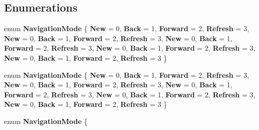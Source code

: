 \subsection*{Enumerations}
\begin{DoxyCompactItemize}
\item 
\mbox{\label{namespace_windows_1_1_u_i_1_1_xaml_1_1_navigation_a9f750cdbb9b4eeea3e47b65bb545d522}} 
enum {\bfseries Navigation\+Mode} \{ \newline
{\bfseries New} = 0, 
{\bfseries Back} = 1, 
{\bfseries Forward} = 2, 
{\bfseries Refresh} = 3, 
\newline
{\bfseries New} = 0, 
{\bfseries Back} = 1, 
{\bfseries Forward} = 2, 
{\bfseries Refresh} = 3, 
\newline
{\bfseries New} = 0, 
{\bfseries Back} = 1, 
{\bfseries Forward} = 2, 
{\bfseries Refresh} = 3, 
\newline
{\bfseries New} = 0, 
{\bfseries Back} = 1, 
{\bfseries Forward} = 2, 
{\bfseries Refresh} = 3, 
\newline
{\bfseries New} = 0, 
{\bfseries Back} = 1, 
{\bfseries Forward} = 2, 
{\bfseries Refresh} = 3
 \}
\item 
\mbox{\label{namespace_windows_1_1_u_i_1_1_xaml_1_1_navigation_a9f750cdbb9b4eeea3e47b65bb545d522}} 
enum {\bfseries Navigation\+Mode} \{ \newline
{\bfseries New} = 0, 
{\bfseries Back} = 1, 
{\bfseries Forward} = 2, 
{\bfseries Refresh} = 3, 
\newline
{\bfseries New} = 0, 
{\bfseries Back} = 1, 
{\bfseries Forward} = 2, 
{\bfseries Refresh} = 3, 
\newline
{\bfseries New} = 0, 
{\bfseries Back} = 1, 
{\bfseries Forward} = 2, 
{\bfseries Refresh} = 3, 
\newline
{\bfseries New} = 0, 
{\bfseries Back} = 1, 
{\bfseries Forward} = 2, 
{\bfseries Refresh} = 3, 
\newline
{\bfseries New} = 0, 
{\bfseries Back} = 1, 
{\bfseries Forward} = 2, 
{\bfseries Refresh} = 3
 \}
\item 
\mbox{\label{namespace_windows_1_1_u_i_1_1_xaml_1_1_navigation_a9f750cdbb9b4eeea3e47b65bb545d522}} 
enum {\bfseries Navigation\+Mode} \{ \newline

\end{DoxyCompactItemize}
